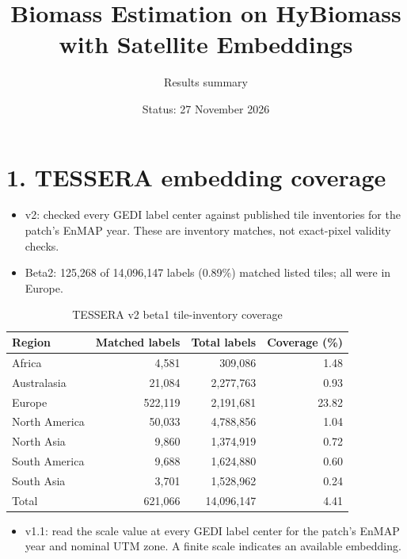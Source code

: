 \documentclass[11pt]{article}
\title{Biomass Estimation on HyBiomass\\with Satellite Embeddings}
\author{Results summary}
\date{Status: 27 November 2026}
\begin{document}
\maketitle

\section*{1. TESSERA embedding coverage}
\begin{itemize}
	\item v2: checked every GEDI label center against published tile inventories for the patch's EnMAP year. These are inventory matches, not exact-pixel validity checks.
	\item Beta2: 125,268 of 14,096,147 labels (0.89\%) matched listed tiles; all were in Europe.
\end{itemize}

\begin{table}[H]
	\centering
	\caption{TESSERA v2 beta1 tile-inventory coverage}
	\small
	\begin{tabular}{@{}lrrr@{}}
		\toprule
		Region        & Matched labels & Total labels & Coverage (\%) \\
		\midrule
		Africa        & 4,581          & 309,086      & 1.48          \\
		Australasia   & 21,084         & 2,277,763    & 0.93          \\
		Europe        & 522,119        & 2,191,681    & 23.82         \\
		North America & 50,033         & 4,788,856    & 1.04          \\
		North Asia    & 9,860          & 1,374,919    & 0.72          \\
		South America & 9,688          & 1,624,880    & 0.60          \\
		South Asia    & 3,701          & 1,528,962    & 0.24          \\
		\midrule
		Total         & 621,066        & 14,096,147   & 4.41          \\
		\bottomrule
	\end{tabular}
\end{table}

\begin{itemize}
	\item v1.1: read the scale value at every GEDI label center for the patch's EnMAP year and nominal UTM zone. A finite scale indicates an available embedding.
\end{itemize}
\end{document}

